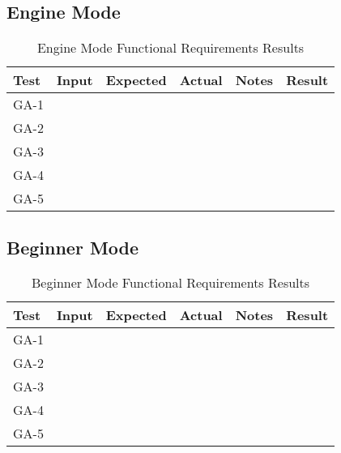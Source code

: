 \documentclass[12pt, titlepage]{article}
\begin{document}
\subsection{Engine Mode}

\begin{table}[H]
    \centering
        \setlength{\leftmargini}{0.4cm}
        \begin{tabular}{| >{\centering\arraybackslash}m{1cm} | 
            >{\centering\arraybackslash}m{2.5cm} | 
            >{\centering\arraybackslash}m{4cm} | 
            >{\centering\arraybackslash}m{3cm} |
            >{\centering\arraybackslash}m{3cm} |
            >{\centering\arraybackslash}m{1.5cm} |}
        \hline
        \rowcolor[gray]{0.9}
        Test & Input & Expected & Actual & Notes & Result\\
        \hline
        GA-1 &  &  &  &  & \\
        \hline
        GA-2 &  &  &  &  & \\
        \hline
        GA-3 &  &  &  &  & \\
        \hline
        GA-4 &  &  &  &  & \\
        \hline
        GA-5 &  &  &  &  & \\
        \hline
        \end{tabular}
    \caption{Engine Mode Functional Requirements Results}
\end{table}

\subsection{Beginner Mode}

\begin{table}[H]
    \centering
        \setlength{\leftmargini}{0.4cm}
        \begin{tabular}{| >{\centering\arraybackslash}m{1cm} | 
            >{\centering\arraybackslash}m{2.5cm} | 
            >{\centering\arraybackslash}m{4cm} | 
            >{\centering\arraybackslash}m{3cm} |
            >{\centering\arraybackslash}m{3cm} |
            >{\centering\arraybackslash}m{1.5cm} |}
        \hline
        \rowcolor[gray]{0.9}
        Test & Input & Expected & Actual & Notes & Result\\
        \hline
        GA-1 &  &  &  &  & \\
        \hline
        GA-2 &  &  &  &  & \\
        \hline
        GA-3 &  &  &  &  & \\
        \hline
        GA-4 &  &  &  &  & \\
        \hline
        GA-5 &  &  &  &  & \\
        \hline
        \end{tabular}
    \caption{Beginner Mode Functional Requirements Results}
\end{table}
\end{document}
